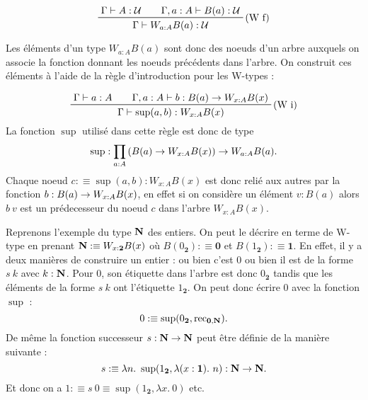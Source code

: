 \documentclass[../../rapport.tex]{subfiles}
\begin{document}
  $$
  \prfinterspace=2em
  \prftree[r]{(W f)}{\Gamma \vdash A : \U}{\Gamma, a : A \vdash B(a) : \U}{\Gamma \vdash W_{a: A} B(a) : \U}
  $$

  Les éléments d'un type $W_{a:A}B(a)$ sont donc des noeuds d'un arbre auxquels on associe la fonction donnant
  les noeuds précédents dans l'arbre. On construit ces éléments à l'aide
  de la règle d'introduction pour les W-types :

  $$
  \prfinterspace=2em
  \prftree[r]{(W i)}{\Gamma \vdash a : A}{\Gamma, a : A \vdash b : B(a) \fun W_{x:A}B(x)}
    {\Gamma \vdash \sup(a, b) : W_{x:A}B(x)}
  $$
  La fonction $\sup$ utilisé dans cette règle est donc de type
  $$\sup : \prod_{a:A}{\left(B(a) \rightarrow W_{x:A}B(x)\right)} \rightarrow W_{a:A}B(a).$$
  Chaque noeud $c :\equiv \sup(a, b) : W_{x:A}B(x)$ est donc relié aux autres par la fonction $b : B(a) \rightarrow W_{x:A}B(x)$,
  en effet si on considère un élément $v : B(a)$ alors $b\ v$ est un prédecesseur du noeud $c$ dans l'arbre $W_{x:A}B(x)$.

  \begin{figure}[ht]
    \centering
  \end{figure}

  Reprenons l'exemple du type $\mathbf N$ des entiers.
  On peut le décrire en terme de W-type en prenant $\mathbf N :\equiv W_{x: \textbf{2}}B(x)$ où $B(0_{\textbf{2}}) :\equiv \textbf{0}$
  et $B(1_{\textbf{2}}) :\equiv \textbf{1}$.
  En effet, il y a deux manières de construire un entier : ou bien c'est 0 ou bien il est de la forme $s\ k$ avec $k : \mathbf N$.
  Pour 0, son étiquette dans l'arbre est donc $0_{\textbf{2}}$ tandis que les éléments de la forme $s\ k$ ont l'étiquette
  $1_{\textbf{2}}$.
  On peut donc écrire 0 avec la fonction $\sup$ :
  $$ 0 :\equiv \sup(0_{\textbf{2}}, \operatorname{rec}_{\textbf{0}, \mathbf N}).$$
  De même la fonction successeur $s : \mathbf N \rightarrow \mathbf N$ peut être définie de la manière suivante :
  $$ s :\equiv \lambda n.\ \sup(1_{\textbf{2}}, \lambda(x : \textbf{1}).\ n) : \N \fun \N.$$
  Et donc on a $1 :\equiv s\ 0 \equiv \sup(1_{\textbf{2}}, \lambda x.\ 0)$ etc.
\end{document}
